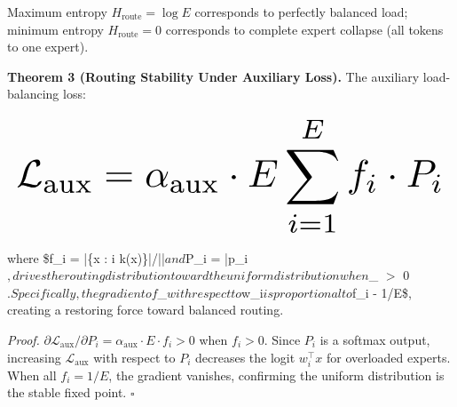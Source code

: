 \documentclass[11pt,a4paper]{article}
\begin{document}
Maximum entropy $H_{\text{route}} = \log E$ corresponds to perfectly balanced load; minimum entropy $H_{\text{route}} = 0$ corresponds to complete expert collapse (all tokens to one expert).

\textbf{Theorem 3 (Routing Stability Under Auxiliary Loss).} The auxiliary load-balancing loss:



























\begin{equation}
\resizebox{\columnwidth}{!}{$\displaystyle
\begin{aligned}
\mathcal{L}_{\text{aux}} = \alpha_{\text{aux}} \cdot E \sum_{i=1}^E f_i \cdot P_i
\end{aligned}
$}
\end{equation}



























where \$f\_i = |\{x \in {} : i \in {}k(x)\}|/||$ and $P\_i = \bar{p}\_i$, drives the routing distribution toward the uniform distribution when $\alpha\_{} $>$ 0$. Specifically, the gradient of $\_{}$ with respect to $w\_i$ is proportional to $f\_i - 1/E\$, creating a restoring force toward balanced routing.

\textit{Proof.} $\partial \mathcal{L}_{\text{aux}}/\partial P_i = \alpha_{\text{aux}} \cdot E \cdot f_i > 0$ when $f_i > 0$. Since $P_i$ is a softmax output, increasing $\mathcal{L}_{\text{aux}}$ with respect to $P_i$ decreases the logit $w_i^\top x$ for overloaded experts. When all $f_i = 1/E$, the gradient vanishes, confirming the uniform distribution is the stable fixed point. $\square$
\end{document}
